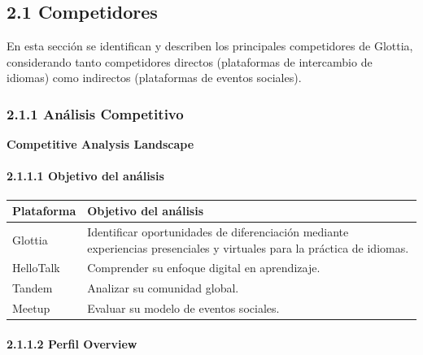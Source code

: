 \subsection{2.1
Competidores}\label{report__20-cap2-requirements-analysis.md__competidores}

En esta sección se identifican y describen los principales competidores
de Glottia, considerando tanto competidores directos (plataformas de
intercambio de idiomas) como indirectos (plataformas de eventos
sociales).

\subsubsection{2.1.1 Análisis
Competitivo}\label{report__20-cap2-requirements-analysis.md__anuxe1lisis-competitivo}

\textbf{Competitive Analysis Landscape}

\paragraph{2.1.1.1 Objetivo del
análisis}\label{report__20-cap2-requirements-analysis.md__objetivo-del-anuxe1lisis}

{\def\LTcaptype{none} %
\begin{longtable}[]{@{}
  >{\raggedright\arraybackslash}p{}
  >{\raggedright\arraybackslash}p{}@{}}
\toprule\noalign{}
\begin{minipage}[b]{\linewidth}\raggedright
Plataforma
\end{minipage} & \begin{minipage}[b]{\linewidth}\raggedright
Objetivo del análisis
\end{minipage} \\
\midrule\noalign{}
\endhead
\bottomrule\noalign{}
\endlastfoot
Glottia & Identificar oportunidades de diferenciación mediante
experiencias presenciales y virtuales para la práctica de idiomas. \\
HelloTalk & Comprender su enfoque digital en aprendizaje. \\
Tandem & Analizar su comunidad global. \\
Meetup & Evaluar su modelo de eventos sociales. \\
\end{longtable}
}

\paragraph{2.1.1.2 Perfil
Overview}\label{report__20-cap2-requirements-analysis.md__perfil-overview}


